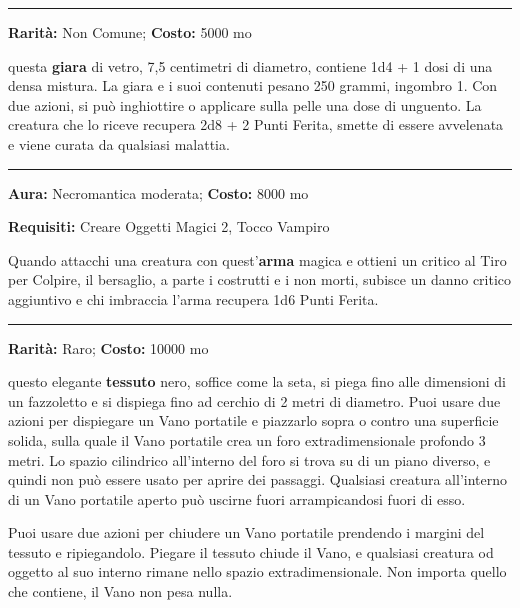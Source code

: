 \begin{multicols}{2}
\smallskip\noindent\rule{\linewidth}{2pt}  \hypertarget{UnguentodiLjust}{}\medskip{}\noindent\label{UnguentodiLjust}

\textbf{Rarità:} Non Comune; \textbf{Costo:} 5000 mo

questa \textbf{giara} di vetro, 7,5 centimetri di diametro, contiene 1d4 + 1 dosi di una densa mistura. La giara e i suoi contenuti pesano 250 grammi, ingombro 1. Con due azioni, si può inghiottire o applicare sulla pelle una dose di unguento. La creatura che lo riceve recupera 2d8 + 2 Punti Ferita, smette di essere avvelenata e viene curata da qualsiasi malattia.

\smallskip\noindent\rule{\linewidth}{2pt}  \hypertarget{Vampira}{}\medskip{}\noindent\label{Vampira}

\textbf{Aura:} Necromantica moderata; \textbf{Costo:} 8000 mo

\textbf{Requisiti:} Creare Oggetti Magici 2, Tocco Vampiro

Quando attacchi una creatura con quest'\textbf{arma} magica e ottieni un critico al Tiro per Colpire, il bersaglio, a parte i costrutti e i non morti, subisce un danno critico aggiuntivo e chi imbraccia l'arma recupera 1d6 Punti Ferita.

\smallskip\noindent\rule{\linewidth}{2pt}  \hypertarget{VanoPortatile}{}\medskip{}\noindent\label{VanoPortatile}

\textbf{Rarità:} Raro; \textbf{Costo:} 10000 mo

questo elegante \textbf{tessuto} nero, soffice come la seta, si piega fino alle dimensioni di un fazzoletto e si dispiega fino ad cerchio di 2 metri di diametro. Puoi usare due azioni per dispiegare un Vano portatile e piazzarlo sopra o contro una superficie solida, sulla quale il Vano portatile crea un foro extradimensionale profondo 3 metri. Lo spazio cilindrico all'interno del foro si trova su di un piano diverso, e quindi non può essere usato per aprire dei passaggi. Qualsiasi creatura all'interno di un Vano portatile aperto può uscirne fuori arrampicandosi fuori di esso.

Puoi usare due azioni per chiudere un Vano portatile prendendo i margini del tessuto e ripiegandolo. Piegare il tessuto chiude il Vano, e qualsiasi creatura od oggetto al suo interno rimane nello spazio extradimensionale. Non importa quello che contiene, il Vano non pesa nulla.


\end{multicols}
